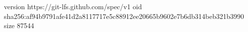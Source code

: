 version https://git-lfs.github.com/spec/v1
oid sha256:af94b9791afe41d2a8117717e5c88912ee20665b9602e7b6db314beb321b3990
size 87544
